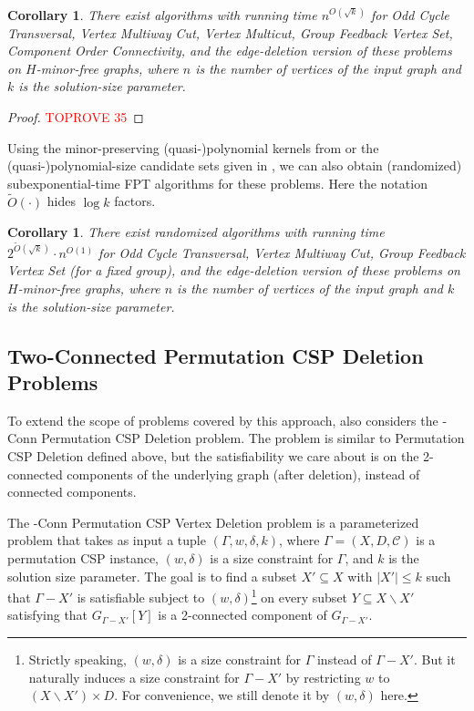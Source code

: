 \documentclass[a4paper,11pt]{article}
\numberwithin{lemma}{section}
\newtheorem{corollary}[lemma]{Corollary}
\begin{document}
\begin{corollary}
 There exist algorithms with running time $n^{O(\sqrt{k})}$ for {\sc Odd Cycle Transversal}, {\sc Vertex Multiway Cut}, {\sc Vertex Multicut}, {\sc Group Feedback Vertex Set}, {\sc Component Order Connectivity}, and the edge-deletion version of these problems on $H$-minor-free graphs, where $n$ is the number of vertices of the input graph and $k$ is the solution-size parameter.
\end{corollary}

\begin{proof}\textcolor{red}{TOPROVE 35}\end{proof}

Using the minor-preserving (quasi-)polynomial kernels from \cite{MarxMNT22} or the (quasi-)polynomial-size candidate sets given in \cite{BandyapadhyayLLSJ22}, we can also obtain (randomized) subexponential-time FPT algorithms for these problems.
Here the notation $\widetilde{O}(\cdot)$ hides $\log k$ factors.

\begin{corollary}
 There exist randomized algorithms with running time $2^{\widetilde{O}(\sqrt{k})} \cdot n^{O(1)}$ for {\sc Odd Cycle Transversal}, {\sc Vertex Multiway Cut}, {\sc Group Feedback Vertex Set} (for a fixed group), and the edge-deletion version of these problems on $H$-minor-free graphs, where $n$ is the number of vertices of the input graph and $k$ is the solution-size parameter.
\end{corollary}

\subsection{Two-Connected Permutation CSP Deletion Problems}

To extend the scope of problems covered by this approach, \cite{MarxMNT22} also considers the {-Conn Permutation CSP Deletion} problem.
The problem is similar to {\sc Permutation CSP Deletion} defined above, but the satisfiability we care about is on the 2-connected components of the underlying graph (after deletion), instead of connected components.

The {-Conn Permutation CSP Vertex Deletion} problem is a parameterized problem that takes as input a tuple $(\varGamma,w,\delta,k)$, where $\varGamma = (X,D,\mathcal{C})$ is a permutation CSP instance, $(w,\delta)$ is a size constraint for $\varGamma$, and $k$ is the solution size parameter.
The goal is to find a subset $X' \subseteq X$ with $|X'| \leq k$ such that $\varGamma - X'$ is satisfiable subject to $(w,\delta)$\footnote{Strictly speaking, $(w,\delta)$ is a size constraint for $\varGamma$ instead of $\varGamma - X'$. But it naturally induces a size constraint for $\varGamma - X'$ by restricting $w$ to $(X \backslash X') \times D$. For convenience, we still denote it by $(w,\delta)$ here.} on every subset $Y \subseteq X \backslash X'$ satisfying that $G_{\varGamma - X'}[Y]$ is a 2-connected component of $G_{\varGamma - X'}$.
\end{document}
